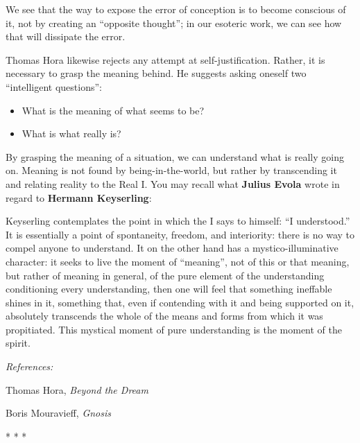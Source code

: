 We see that the way to expose the error of conception is to become conscious of it, not by creating an ``opposite thought''; in our esoteric work, we can see how that will dissipate the error.

Thomas Hora likewise rejects any attempt at self-justification. Rather, it is necessary to grasp the meaning behind. He suggests asking oneself two ``intelligent questions'':

\begin{itemize}


\item What is the meaning of what seems to be?

\item What is what really is?
\end{itemize}


By grasping the meaning of a situation, we can understand what is really going on. Meaning is not found by being-in-the-world, but rather by transcending it and relating reality to the Real I. You may recall what \textbf{Julius Evola} wrote in regard to \textbf{Hermann Keyserling}:


\begin{quotex} 
Keyserling contemplates the point in which the I says to himself: ``I understood.'' It is essentially a point of spontaneity, freedom, and interiority: there is no way to compel anyone to understand. It on the other hand has a mystico-illuminative character: it seeks to live the moment of ``meaning'', not of this or that meaning, but rather of meaning in general, of the pure element of the understanding conditioning every understanding, then one will feel that something ineffable shines in it, something that, even if contending with it and being supported on it, absolutely transcends the whole of the means and forms from which it was propitiated. This mystical moment of pure understanding is the moment of the spirit.
\end{quotex}

\textit{References:}

Thomas Hora, \emph{Beyond the Dream}

Boris Mouravieff, \emph{Gnosis}



\begin{center}* * *\end{center}


